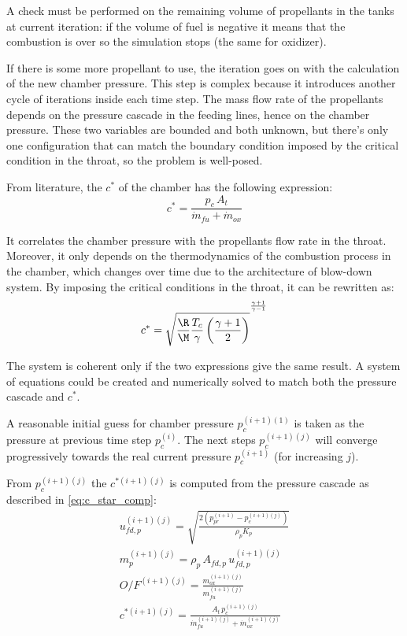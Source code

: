 A check must be performed on the remaining volume of propellants in the tanks at current iteration: if the volume of fuel is negative it means that the combustion is over so the simulation stops (the same for oxidizer).

If there is some more propellant to use, the iteration goes on with the calculation of the new chamber pressure. This step is complex because it introduces another cycle of iterations inside each time step.
The mass flow rate of the propellants depends on the pressure cascade in the feeding lines, hence on the chamber pressure. These two variables are bounded and both unknown, but there's only one configuration that can match the boundary condition imposed by the critical condition in the throat, so the problem is well-posed.

From literature, the $c^*$ of the chamber has the following expression:
\begin{equation}
    c^* = \frac{p_c \, A_t}{\dot{m}_{fu} + \dot{m}_{ox}}
    \label{eq:c_star_comp}
\end{equation}

It correlates the chamber pressure with the propellants flow rate in the throat. Moreover, it only depends on the thermodynamics of the combustion process in the chamber, which changes over time due to the architecture of blow-down system. By imposing the critical conditions in the throat, it can be rewritten as:
\begin{equation}
    c^* = \sqrt{\frac{\R}{\M} \frac{T_c}{\gamma} \left( \frac{\gamma + 1}{2} \right)} ^{^{^ {\frac{\gamma + 1}{\gamma - 1}} }}
    \label{eq:c_star_cea}
\end{equation}

The system is coherent only if the two expressions give the same result. A system of equations could be created and numerically solved to match both the pressure cascade and $c^*$.

A reasonable initial guess for chamber pressure $p_c ^ {(i+1)(1)}$ is taken as the pressure at previous time step $p_c ^ {(i)}$. The next steps $p_c ^ {(i+1)(j)}$ will converge progressively towards the real current pressure $p_c ^ {(i+1)}$ (for increasing $j$).

From $p_c ^ {(i+1)(j)}$ the $c^{*(i+1)(j)}$ is computed from the pressure cascade as described in \autoref{eq:c_star_comp}:
\begin{gather}
    u_{fd,p} ^ {(i+1)(j)} = \sqrt{\frac{2 \left( p_{pr} ^ {(i+1)} - p_c ^ {(i+1)(j)} \right)}{\rho_p K_p}}
    \\[3pt]
    m_p ^ {(i+1)(j)} = \rho_p \, A_{fd,p} \, u_{fd,p} ^ {(i+1)(j)}
    \\[3pt]
    O/F ^ {(i+1)(j)} = \frac{m_{ox} ^ {(i+1)(j)}}{m_{fu} ^ {(i+1)(j)}}
    \\[3pt]
    c^{*(i+1)(j)} = \frac{A_t \, p_c ^ {(i+1)(j)}}{\dot{m}_{fu} ^ {(i+1)(j)} + \dot{m}_{ox} ^ {(i+1)(j)}}
\end{gather}

